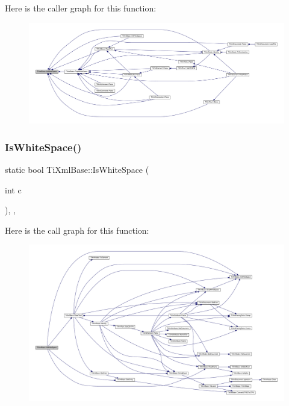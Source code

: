 Here is the caller graph for this function\+:
\nopagebreak
\begin{figure}[H]
\begin{center}
\leavevmode
\includegraphics[width=350pt]{class_ti_xml_base_af56296d561c0bab4bc8e198cdcf5c48e_icgraph}
\end{center}
\end{figure}
\mbox{\label{class_ti_xml_base_a3de391ea9f4c4a8aa10d04480b048795}} 
\subsubsection{\texorpdfstring{Is\+White\+Space()}{IsWhiteSpace()}\hspace{0.1cm}{\footnotesize\ttfamily [2/2]}}
{\footnotesize\ttfamily static bool Ti\+Xml\+Base\+::\+Is\+White\+Space (\begin{DoxyParamCaption}\item[{int}]{c }\end{DoxyParamCaption})\hspace{0.3cm}{\ttfamily [inline]}, {\ttfamily [static]}, {\ttfamily [protected]}}

Here is the call graph for this function\+:
\nopagebreak
\begin{figure}[H]
\begin{center}
\leavevmode
\includegraphics[width=350pt]{class_ti_xml_base_a3de391ea9f4c4a8aa10d04480b048795_cgraph}
\end{center}
\end{figure}
\mbox{\label{class_ti_xml_base_ad4b1472531c647a25b1840a87ae42438}} 
